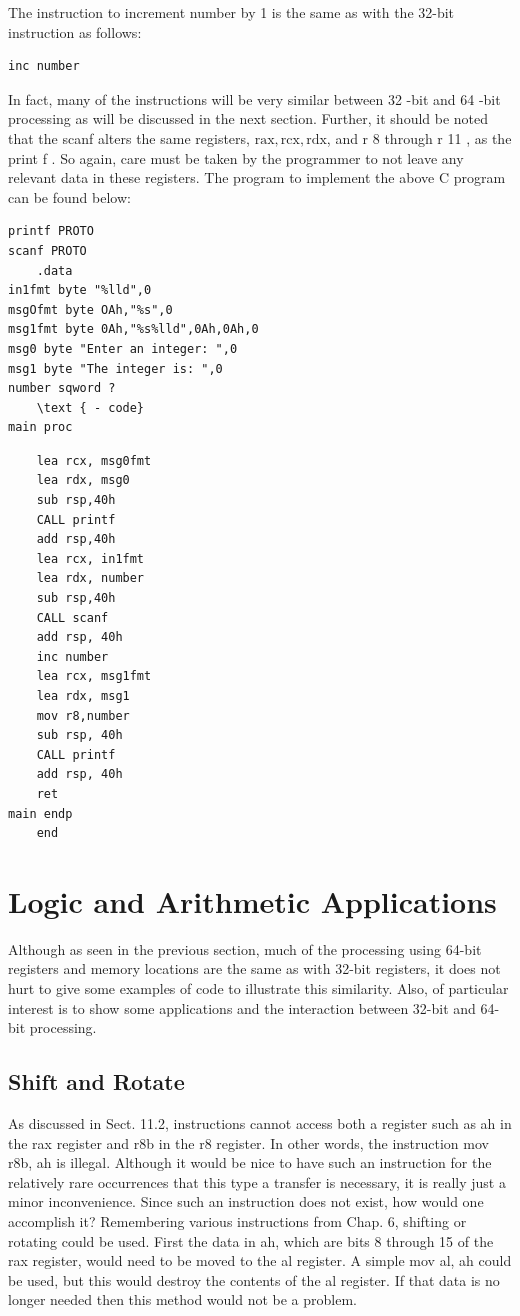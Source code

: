 \documentclass[10pt]{book}
\begin{document}
The instruction to increment number by 1 is the same as with the 32-bit instruction as follows:

\begin{verbatim}
inc number
\end{verbatim}

In fact, many of the instructions will be very similar between 32 -bit and 64 -bit processing as will be discussed in the next section. Further, it should be noted that the scanf alters the same registers, $\mathrm{rax}, \mathrm{rcx}, \mathrm{rdx}$, and r 8 through r 11 , as the print f . So again, care must be taken by the programmer to not leave any relevant data in these registers. The program to implement the above C program can be found below:

\begin{verbatim}
printf PROTO
scanf PROTO
    .data
in1fmt byte "%lld",0
msgOfmt byte OAh,"%s",0
msg1fmt byte 0Ah,"%s%lld",0Ah,0Ah,0
msg0 byte "Enter an integer: ",0
msg1 byte "The integer is: ",0
number sqword ?
    \text { - code}
main proc
\end{verbatim}

\begin{verbatim}
    lea rcx, msg0fmt
    lea rdx, msg0
    sub rsp,40h
    CALL printf
    add rsp,40h
    lea rcx, in1fmt
    lea rdx, number
    sub rsp,40h
    CALL scanf
    add rsp, 40h
    inc number
    lea rcx, msg1fmt
    lea rdx, msg1
    mov r8,number
    sub rsp, 40h
    CALL printf
    add rsp, 40h
    ret
main endp
    end
\end{verbatim}

\section{Logic and Arithmetic Applications}
Although as seen in the previous section, much of the processing using 64-bit registers and memory locations are the same as with 32-bit registers, it does not hurt to give some examples of code to illustrate this similarity. Also, of particular interest is to show some applications and the interaction between 32-bit and 64-bit processing.

\subsection{Shift and Rotate}
As discussed in Sect. 11.2, instructions cannot access both a register such as ah in the rax register and r8b in the r8 register. In other words, the instruction mov r8b, ah is illegal. Although it would be nice to have such an instruction for the\\
relatively rare occurrences that this type a transfer is necessary, it is really just a minor inconvenience. Since such an instruction does not exist, how would one accomplish it? Remembering various instructions from Chap. 6, shifting or rotating could be used. First the data in ah, which are bits 8 through 15 of the rax register, would need to be moved to the al register. A simple mov al, ah could be used, but this would destroy the contents of the al register. If that data is no longer needed then this method would not be a problem.
\end{document}
